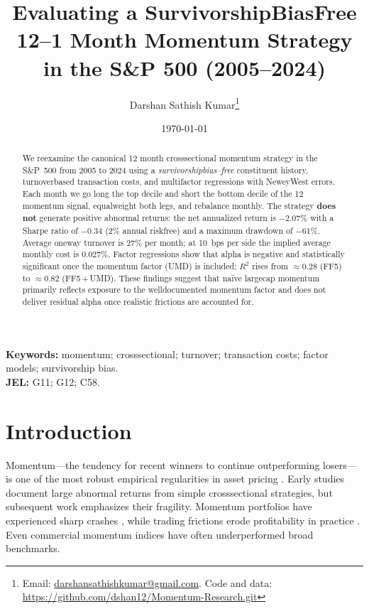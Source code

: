 \documentclass[11pt]{article}
\title{Evaluating a Survivorship\textendash Bias\textendash Free 12--1 Month Momentum Strategy in the S\&P 500 (2005--2024)}
\author{%
  Darshan Sathish Kumar\thanks{Email: \href{mailto:darshansathishkumar@gmail.com}{darshansathishkumar@gmail.com}. Code and data: \url{https://github.com/dshan12/Momentum-Research.git}}%
}
\date{\today}
\begin{document}
\maketitle

\begin{abstract}
We re\textendash examine the canonical 12 month cross\textendash sectional momentum strategy in the S\&P~500 from 2005 to 2024 using a \emph{survivorship\textendash bias–free} constituent history, turnover\textendash based transaction costs, and multi\textendash factor regressions with Newey\textendash West errors. Each month we go long the top decile and short the bottom decile of the 12 momentum signal, equal\textendash weight both legs, and rebalance monthly. The strategy \textbf{does not} generate positive abnormal returns: the net annualized return is \(-2.07\%\) with a Sharpe ratio of \(-0.34\) (2\% annual risk\textendash free) and a maximum drawdown of \(-61\%\). Average one\textendash way turnover is \(27\%\) per month; at 10~bps per side the implied average monthly cost is \(0.027\%\). Factor regressions show that alpha is negative and statistically significant once the momentum factor (UMD) is included; \(R^2\) rises from \(\approx 0.28\) (FF5) to \(\approx 0.82\) (FF5\,+\,UMD). These findings suggest that naïve large\textendash cap momentum primarily reflects exposure to the well\textendash documented momentum factor and does not deliver residual alpha once realistic frictions are accounted for.
\end{abstract}

\noindent\textbf{Keywords:} momentum; cross\textendash sectional; turnover; transaction costs; factor models; survivorship bias.\\
\textbf{JEL:} G11; G12; C58.

\section{Introduction}
Momentum---the tendency for recent winners to continue outperforming losers---is one of the most robust empirical regularities in asset pricing \citep{Jegadeesh1993,carhart1997persistence,Asness2019}. Early studies document large abnormal returns from simple cross\textendash sectional strategies, but subsequent work emphasizes their fragility. Momentum portfolios have experienced sharp crashes \citep{Daniel2016}, while trading frictions erode profitability in practice \citep{NovyMarx2016}. Even commercial momentum indices have often underperformed broad benchmarks.
\end{document}
